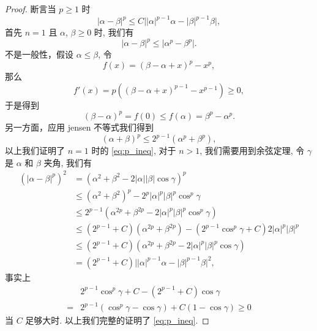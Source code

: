 \documentclass[twoside,longtitle]{LZUthesis}
\theoremstyle{definition}
\numberwithin{equation}{chapter}
\newcommand*\abs[1]{\lvert#1\rvert}
\begin{document}
\begin{proof}
	断言当 $p \geq 1 $ 时
	\begin{equation}\label{eq:p_ineq}
		\abs{\alpha-\beta}^p \leq C\abs{\abs{\alpha}^{p-1}\alpha - \abs{\beta}^{p-1}\beta},
	\end{equation}
	首先 $n = 1$ 且 $\alpha$, $\beta \geq 0$ 时, 我们有
	\begin{equation}
		\abs{\alpha-\beta}^p \leq \abs{\alpha^p - \beta^p}.
	\end{equation}
	不是一般性，假设 $\alpha \leq \beta$, 令
	\begin{equation}
		f(x) = (\beta-\alpha+x)^p - x^p,
	\end{equation}
	那么
	\begin{equation}
		f'(x) = p\left((\beta-\alpha+x)^{p-1} - x^{p-1}\right) \geq 0,
	\end{equation}
	于是得到
	\begin{equation}
		\left(\beta-\alpha\right)^p = f(0) \leq f(\alpha) = \beta^p - \alpha^p.
	\end{equation}
	另一方面，应用 jensen 不等式我们得到
	\begin{equation}
		\left(\alpha+\beta\right)^p \leq 2^{p-1}\left(\alpha^p + \beta^p\right),
	\end{equation}
	以上我们证明了 $n = 1$ 时的 \cref{eq:p_ineq},
	对于 $n > 1$, 我们需要用到余弦定理, 令 $\gamma$ 是 $\alpha$ 和 $\beta$ 夹角, 我们有
	\begin{equation}
		\begin{split}
			\left(\abs{\alpha-\beta}^p\right)^2
			&= \left(\alpha^2 + \beta^2 - 2 \abs{\alpha}\abs{\beta}\cos{\gamma}\right)^p\\
			&\leq \left(\alpha^2+\beta^2\right)^p - 2^p\abs{\alpha}^p\abs{\beta}^p\cos^p{\gamma}\\
			&\leq 2^{p-1}\left(\alpha^{2p} + \beta^{2p} - 2\abs{\alpha}^p\abs{\beta}^p\cos^p{\gamma}\right)\\
			&\leq \left(2^{p-1}+C\right)\left(\alpha^{2p} + \beta^{2p}\right)
			- \left(2^{p-1}\cos^p{\gamma}+C\right)2\abs{\alpha}^p\abs{\beta}^p\\
			&\leq \left(2^{p-1}+C\right)\left(\alpha^{2p} + \beta^{2p} - 2\abs{\alpha}^p\abs{\beta}^p\cos{\gamma}\right)\\
			&= \left(2^{p-1}+C\right)\abs{\abs{\alpha}^{p-1}\alpha - \abs{\beta}^{p-1}\beta}^2,
		\end{split}
	\end{equation}
	事实上
	\begin{equation}
		\begin{split}
			& 2^{p-1}\cos^p{\gamma} + C - \left(2^{p-1}+C\right)\cos{\gamma}\\
			={} & 2^{p-1}\left(\cos^p{\gamma} - \cos{\gamma}\right) + C\left(1-\cos{\gamma}\right)
			\geq 0
		\end{split}
	\end{equation}
	当 $C$ 足够大时. 以上我们完整的证明了 \cref{eq:p_ineq}.


\end{proof}
\end{document}
